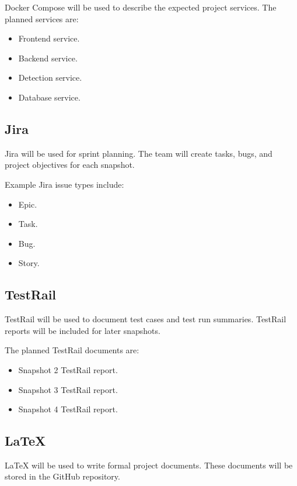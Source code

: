 \documentclass[12pt]{article}
\begin{document}
Docker Compose will be used to describe the expected project services. The planned services are:

\begin{itemize}
    \item Frontend service.
    \item Backend service.
    \item Detection service.
    \item Database service.
\end{itemize}

\subsection{Jira}

Jira will be used for sprint planning. The team will create tasks, bugs, and project objectives for each snapshot.

Example Jira issue types include:

\begin{itemize}
    \item Epic.
    \item Task.
    \item Bug.
    \item Story.
\end{itemize}

\subsection{TestRail}

TestRail will be used to document test cases and test run summaries. TestRail reports will be included for later snapshots.

The planned TestRail documents are:

\begin{itemize}
    \item Snapshot 2 TestRail report.
    \item Snapshot 3 TestRail report.
    \item Snapshot 4 TestRail report.
\end{itemize}

\subsection{LaTeX}

LaTeX will be used to write formal project documents. These documents will be stored in the GitHub repository.
\end{document}
